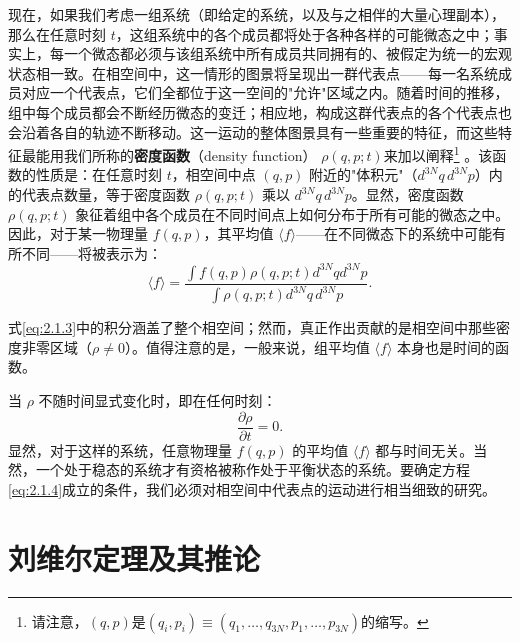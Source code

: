 现在，如果我们考虑一组系统（即给定的系统，以及与之相伴的大量心理副本），那么在任意时刻 \(t\)，这组系统中的各个成员都将处于各种各样的可能微态之中；事实上，每一个微态都必须与该组系统中所有成员共同拥有的、被假定为统一的宏观状态相一致。在相空间中，这一情形的图景将呈现出一群代表点——每一名系统成员对应一个代表点，它们全都位于这一空间的"允许"区域之内。随着时间的推移，组中每个成员都会不断经历微态的变迁；相应地，构成这群代表点的各个代表点也会沿着各自的轨迹不断移动。这一运动的整体图景具有一些重要的特征，而这些特征最能用我们所称的\textbf{密度函数}（density function） \(\rho(q,p;t)\)来加以阐释\footnote{请注意，\((q,p)\)是\((q_i,p_i)≡(q_1,\ldots,q_{3N},p_1,\ldots,p_{3N})\)的缩写。} 。该函数的性质是：在任意时刻 \(t\)，相空间中点 \((q,p)\) 附近的"体积元"（\(d^{3N}q\,d^{3N}p\)）内的代表点数量，等于密度函数 \(\rho(q,p;t)\) 乘以 \(d^{3N}q\,d^{3N}p\)。显然，密度函数 \(\rho(q,p;t)\) 象征着组中各个成员在不同时间点上如何分布于所有可能的微态之中。因此，对于某一物理量 \(f(q,p)\)，其平均值 \(\langle f \rangle\)——在不同微态下的系统中可能有所不同——将被表示为：
\begin{equation}\tag{2.1.3}\label{eq:2.1.3}
\langle f \rangle = \frac { \int f ( q , p ) \rho ( q , p ; t ) d ^{3 N} q d ^{3 N} p } { \int \rho ( q , p ; t ) d ^{3 N} q \, d ^{3 N} p } .
\end{equation}

式\ref{eq:2.1.3}中的积分涵盖了整个相空间；然而，真正作出贡献的是相空间中那些密度非零区域（\(\rho \neq 0\)）。值得注意的是，一般来说，组平均值 \(\langle f \rangle\) 本身也是时间的函数。

当 \(\rho\) 不随时间显式变化时，即在任何时刻：
\begin{equation}
    \tag{2.1.4}\label{eq:2.1.4}
    \frac { \partial \rho } { \partial t } = 0 .
\end{equation}
显然，对于这样的系统，任意物理量 \(f(q,p)\) 的平均值 \(\langle f\rangle\) 都与时间无关。当然，一个处于稳态的系统才有资格被称作处于平衡状态的系统。要确定方程\ref{eq:2.1.4}成立的条件，我们必须对相空间中代表点的运动进行相当细致的研究。

\section{刘维尔定理及其推论}\label{sec:2.2}

